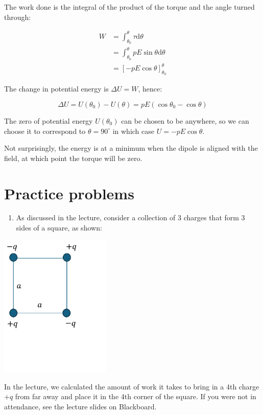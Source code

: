 \documentclass[
  letterpaper,
  DIV=11,
  numbers=noendperiod]{scrreprt}
\providecommand{\tightlist}{%
  \setlength{\itemsep}{0pt}\setlength{\parskip}{0pt}}\usepackage{longtable,booktabs,array}
\begin{document}
The work done is the integral of the product of the torque and the angle
turned through:

\[
\begin{split} 
W & = \int_{\theta_0}^{\theta} \tau \mathrm{d} \theta \\
& = \int_{\theta_0}^{\theta} pE\sin\theta \mathrm{d} \theta \\
& = [-pE \cos \theta]_{\theta_0}^{\theta} 
\end{split}
\]

The change in potential energy is \(\Delta U = W\), hence:

\[ \Delta U = U(\theta_0) - U (\theta) = pE(\cos\theta_0 - \cos\theta) \]

The zero of potential energy \(U(\theta_0)\) can be chosen to be
anywhere, so we can choose it to correspond to \(\theta = 90^{\circ}\)
in which case \(U = -pE\cos\theta\).

Not surprisingly, the energy is at a minimum when the dipole is aligned
with the field, at which point the torque will be zero.

\section{Practice problems}\label{practice-problems-2}

\begin{enumerate}
\def\labelenumi{\arabic{enumi})}
\tightlist
\item
  As discussed in the lecture, consider a collection of 3 charges that
  form 3 sides of a square, as shown:
\end{enumerate}

\includegraphics[width=2.08333in,height=\textheight]{Figures/L3_3charges.png}

In the lecture, we calculated the amount of work it takes to bring in a
4th charge \(+q\) from far away and place it in the 4th corner of the
square. If you were not in attendance, see the lecture slides on
Blackboard.
\end{document}
